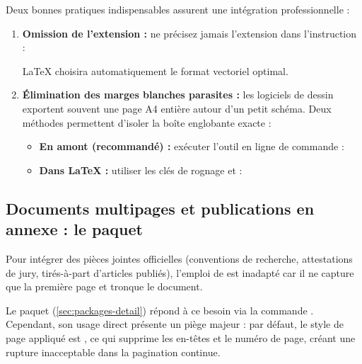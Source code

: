 Deux bonnes pratiques indispensables assurent une intégration professionnelle :
\begin{enumerate}
  \item \textbf{Omission de l'extension :} ne précisez jamais l'extension  dans l'instruction :
  \begin{center}
  \end{center}
  \LaTeX{} choisira automatiquement le format vectoriel optimal.
  \item \textbf{Élimination des marges blanches parasites :} les logiciels de dessin exportent souvent une page A4 entière autour d'un petit schéma. Deux méthodes permettent d'isoler la boîte englobante exacte :
  \begin{itemize}
    \item \textbf{En amont (recommandé) :} exécuter l'outil en ligne de commande  :
    \begin{center}
    \end{center}
    \item \textbf{Dans \LaTeX{} :} utiliser les clés de rognage  et  :
    \begin{center}
    \end{center}
  \end{itemize}
\end{enumerate}

\subsection{Documents multipages et publications en annexe : le paquet }
Pour intégrer des pièces jointes officielles (conventions de recherche, attestations de jury, tirés-à-part d'articles publiés),
l'emploi de  est inadapté car il ne capture que la première page et tronque le document.

Le paquet  (\cref{sec:packages-detail}) répond à ce besoin via la commande .
Cependant, son usage direct présente un piège majeur :
par défaut, le style de page appliqué est ,
ce qui supprime les en-têtes et le numéro de page,
créant une rupture inacceptable dans la pagination continue.

